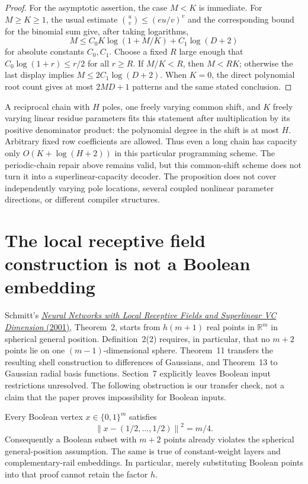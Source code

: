 \documentclass[11pt]{article}
\begin{document}
\begin{proof}
For the asymptotic assertion, the case $M<K$ is immediate. For
$M\ge K\ge1$, the usual estimate
$\binom uv\le(eu/v)^v$ and the corresponding bound for the binomial
sum give, after taking logarithms,
\[
 M\le C_0 K\log(1+M/K)+C_1\log(D+2)
\]
for absolute constants $C_0,C_1$. Choose a fixed $R$ large enough
that $C_0\log(1+r)\le r/2$ for all $r\ge R$. If $M/K<R$, then
$M<RK$; otherwise the last display implies
$M\le2C_1\log(D+2)$. When $K=0$, the direct polynomial root count
gives at most $2MD+1$ patterns and the same stated conclusion.
\end{proof}

A reciprocal chain with $H$ poles, one freely varying common shift,
and $K$ freely varying linear residue parameters fits this statement
after multiplication by its positive denominator product: the
polynomial degree in the shift is at most $H$. Arbitrary fixed row
coefficients are allowed. Thus even a long chain has capacity only
$O(K+\log(H+2))$ in this particular programming scheme. The
periodic-chain repair above remains valid, but this common-shift
scheme does not turn it into a superlinear-capacity decoder. The
proposition does not cover independently varying pole locations,
several coupled nonlinear parameter directions, or different
compiler structures.

\section{The local receptive field construction is not a Boolean embedding}

Schmitt's
\href{https://eccc.weizmann.ac.il/report/2001/045/download/}{\emph{Neural
Networks with Local Receptive Fields and Superlinear VC Dimension}
(2001)}, Theorem~2, starts from $h(m+1)$ real points in
$\mathbb R^m$ in spherical general position. Definition~2(2)
requires, in particular, that no $m+2$ points lie on one
$(m-1)$-dimensional sphere. Theorem~11 transfers the resulting
shell construction to differences of Gaussians, and Theorem~13 to
Gaussian radial basis functions. Section~7 explicitly leaves
Boolean input restrictions unresolved. The following obstruction is
our transfer check, not a claim that the paper proves impossibility
for Boolean inputs.

Every Boolean vertex $x\in\{0,1\}^m$ satisfies
\[
 \left\|x-(1/2,\ldots,1/2)\right\|^2=m/4.
\]
Consequently a Boolean subset with $m+2$ points already violates
the spherical general-position assumption. The same is true of
constant-weight layers and complementary-rail embeddings. In
particular, merely substituting Boolean points into that proof
cannot retain the factor $h$.
\end{document}

